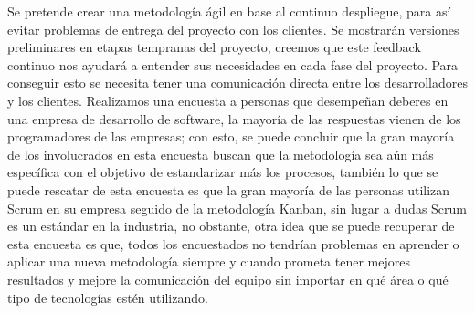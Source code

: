 Se pretende crear una metodología ágil en base al continuo despliegue, para así evitar
problemas de entrega del proyecto con los clientes. Se mostrarán versiones preliminares en
etapas tempranas del proyecto, creemos que este feedback continuo nos ayudará a
entender sus necesidades en cada fase del proyecto. Para conseguir esto se necesita tener
una comunicación directa entre los desarrolladores y los clientes.
Realizamos una encuesta a personas que desempeñan deberes en una empresa de
desarrollo de software, la mayoría de las respuestas vienen de los programadores de las
empresas; con esto, se puede concluir que la gran mayoría de los involucrados en esta
encuesta buscan que la metodología sea aún más específica con el objetivo de estandarizar más los procesos, también lo que se puede rescatar de esta encuesta es que la gran
mayoría de las personas utilizan Scrum en su empresa seguido de la metodología Kanban,
sin lugar a dudas Scrum es un estándar en la industria, no obstante, otra idea que se puede
recuperar de esta encuesta es que, todos los encuestados no tendrían problemas en
aprender o aplicar una nueva metodología siempre y cuando prometa tener mejores
resultados y mejore la comunicación del equipo sin importar en qué área o qué tipo de
tecnologías estén utilizando.